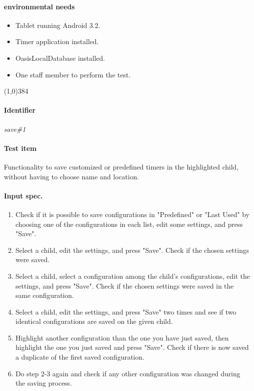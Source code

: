 \paragraph{environmental needs}
	\begin{itemize}
		\item Tablet running Android 3.2.
		\item Timer application installed.
		\item OasisLocalDatabase installed.
		\item One staff member to perform the test.
	\end{itemize}
\begin{center}
	\line(1,0){384}
\end{center}

\pagebreak
\paragraph{Identifier}
	\textit{save\#1}
\paragraph{Test item}
	Functionality to save customized or predefined timers in the highlighted child, without having to choose name and location.
\paragraph{Input spec.}
	\begin{enumerate}
		\item Check if it is possible to save configurations in "Predefined" or "Last Used" by choosing one of the configurations in each list, edit some settings, and press "Save".
		\item Select a child, edit the settings, and press "Save". Check if the chosen settings were saved.
		\item Select a child, select a configuration among the child's configurations, edit the settings, and press "Save". Check if the chosen settings were saved in the same configuration.
		\item Select a child, edit the settings, and press "Save" two times and see if two identical configurations are saved on the given child.
		\item Highlight another configuration than the one you have just saved, then highlight the one you just saved and press "Save". Check if there is now saved a duplicate of the first saved configuration.
		\item Do step 2-3 again and check if any other configuration was changed during the saving process.
	\end{enumerate}
